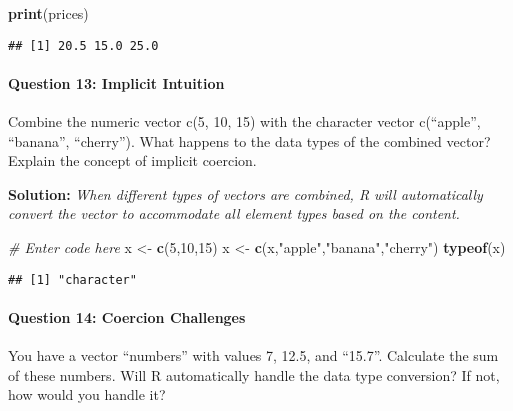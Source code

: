 \documentclass[
]{article}
\newenvironment{Shaded}{\begin{snugshade}}{\end{snugshade}}
\newcommand{\CommentTok}[1]{\textcolor[rgb]{0.56,0.35,0.01}{\textit{#1}}}
\newcommand{\DecValTok}[1]{\textcolor[rgb]{0.00,0.00,0.81}{#1}}
\newcommand{\FunctionTok}[1]{\textcolor[rgb]{0.13,0.29,0.53}{\textbf{#1}}}
\newcommand{\NormalTok}[1]{#1}
\newcommand{\OtherTok}[1]{\textcolor[rgb]{0.56,0.35,0.01}{#1}}
\newcommand{\StringTok}[1]{\textcolor[rgb]{0.31,0.60,0.02}{#1}}
\begin{document}
\begin{Shaded}
\begin{Highlighting}[]
\FunctionTok{print}\NormalTok{(prices)}
\end{Highlighting}
\end{Shaded}

\begin{verbatim}
## [1] 20.5 15.0 25.0
\end{verbatim}

\hypertarget{question-13-implicit-intuition}{%
\paragraph{Question 13: Implicit
Intuition}\label{question-13-implicit-intuition}}

Combine the numeric vector c(5, 10, 15) with the character vector
c(``apple'', ``banana'', ``cherry''). What happens to the data types of
the combined vector? Explain the concept of implicit coercion.

\textbf{Solution:} \emph{When different types of vectors are combined, R
will automatically convert the vector to accommodate all element types
based on the content.}

\begin{Shaded}
\begin{Highlighting}[]
\CommentTok{\# Enter code here}
\NormalTok{x }\OtherTok{\textless{}{-}} \FunctionTok{c}\NormalTok{(}\DecValTok{5}\NormalTok{,}\DecValTok{10}\NormalTok{,}\DecValTok{15}\NormalTok{)}
\NormalTok{x }\OtherTok{\textless{}{-}} \FunctionTok{c}\NormalTok{(x,}\StringTok{"apple"}\NormalTok{,}\StringTok{"banana"}\NormalTok{,}\StringTok{"cherry"}\NormalTok{)}
\FunctionTok{typeof}\NormalTok{(x)}
\end{Highlighting}
\end{Shaded}

\begin{verbatim}
## [1] "character"
\end{verbatim}

\hypertarget{question-14-coercion-challenges}{%
\paragraph{Question 14: Coercion
Challenges}\label{question-14-coercion-challenges}}

You have a vector ``numbers'' with values 7, 12.5, and ``15.7''.
Calculate the sum of these numbers. Will R automatically handle the data
type conversion? If not, how would you handle it?
\end{document}
